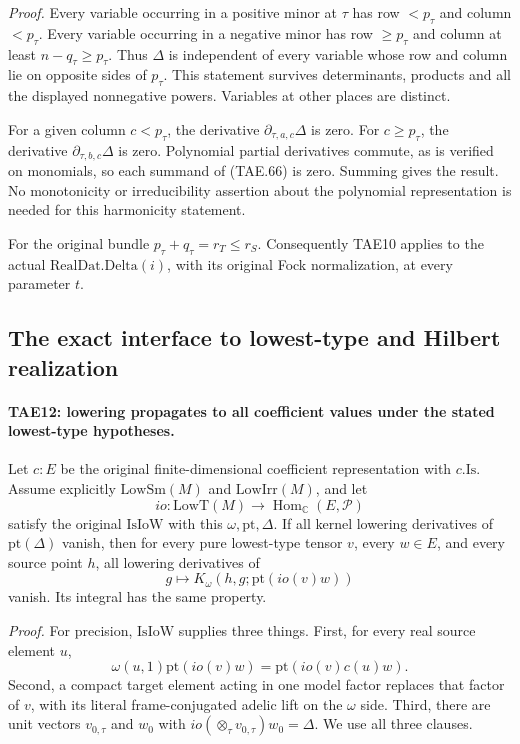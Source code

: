 \emph{Proof.}
Every variable occurring in a positive minor at \(\tau\)
has row \(<p_\tau\) and column \(<p_\tau\).
Every variable occurring in a negative minor has row
\(\ge p_\tau\) and column at least
\(n-q_\tau\ge p_\tau\).
Thus \(\Delta\) is independent of every variable whose
row and column lie on opposite sides of \(p_\tau\).
This statement survives determinants, products and all
the displayed nonnegative powers.  Variables at other
places are distinct.

For a given column \(c<p_\tau\), the derivative
\(\partial_{\tau,a,c}\Delta\) is zero.
For \(c\ge p_\tau\), the derivative
\(\partial_{\tau,b,c}\Delta\) is zero.
Polynomial partial derivatives commute, as is verified
on monomials, so each summand of (TAE.66) is zero.
Summing gives the result.  No monotonicity or irreducibility
assertion about the polynomial representation is needed
for this harmonicity statement.

For the original bundle \(p_\tau+q_\tau=r_T\le r_S\).
Consequently TAE10 applies to the actual
\(\mathrm{RealDat.Delta}(i)\), with its original
Fock normalization, at every parameter \(t\).

\subsection*{The exact interface to lowest-type and Hilbert realization}

\paragraph{TAE12: lowering propagates to all coefficient values under the stated lowest-type hypotheses.}
\label{claim:TAE12}
Let \(c:E\) be the original finite-dimensional coefficient
representation with \(c.\mathrm{Is}\).  Assume explicitly
\(\mathrm{LowSm}(M)\) and \(\mathrm{LowIrr}(M)\), and let
\[
 io:\mathrm{LowT}(M)\longrightarrow
              \operatorname{Hom}_{\mathbb C}(E,\mathcal P)
 \tag{TAE.67}
\]
satisfy the original \(\mathrm{IsIoW}\) with this
\(\omega,\mathrm{pt},\Delta\).
If all kernel lowering derivatives of
\(\mathrm{pt}(\Delta)\) vanish, then for every pure
lowest-type tensor \(v\), every \(w\in E\), and every source
point \(h\), all lowering derivatives of
\[
             g\longmapsto
             K_\omega(h,g;\mathrm{pt}(io(v)w))
 \tag{TAE.68}
\]
vanish.  Its integral has the same property.

\emph{Proof.}
For precision, \(\mathrm{IsIoW}\) supplies three things.
First, for every real source element \(u\),
\[
       \omega(u,1)\mathrm{pt}(io(v)w)
                           =\mathrm{pt}(io(v)c(u)w).
 \tag{TAE.69}
\]
Second, a compact target element acting in one model
factor replaces that factor of \(v\), with its literal
frame-conjugated adelic lift on the \(\omega\) side.
Third, there are unit vectors \(v_{0,\tau}\) and
\(w_0\) with \(io(\otimes_\tau v_{0,\tau})w_0=\Delta\).
We use all three clauses.

